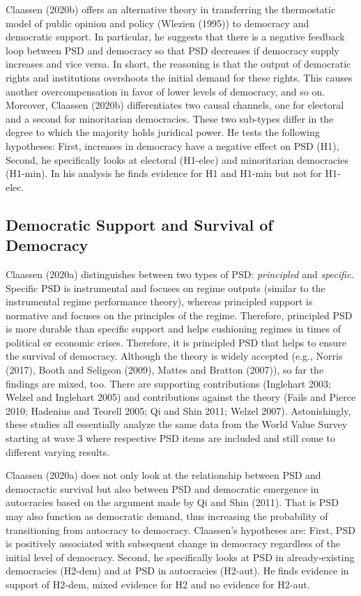 \documentclass[12pt,english,a4paper,oneside]{article}
\theoremstyle{definition}
\theoremstyle{definition}
\theoremstyle{definition}
\theoremstyle{definition}
\theoremstyle{remark}
\begin{document}
Claassen (2020b) offers an alternative theory in transferring the thermostatic model of public opinion and policy (Wlezien (1995)) to democracy and democratic support. In particular, he suggests that there is a negative feedback loop between PSD and democracy so that PSD decreases if democracy supply increases and vice versa. In short, the reasoning is that the output of democratic rights and institutions overshoots the initial demand for these rights. This causes another overcompensation in favor of lower levels of democracy, and so on. Moreover, Claassen (2020b) differentiates two causal channels, one for electoral and a second for minoritarian democracies. These two sub-types differ in the degree to which the majority holds juridical power. He tests the following hypotheses: First, increases in democracy have a negative effect on PSD (H1), Second, he specifically looks at electoral (H1-elec) and minoritarian democracies (H1-min). In his analysis he finds evidence for H1 and H1-min but not for H1-elec.

\hypertarget{democratic-support-and-survival-of-democracy}{%
\subsection{Democratic Support and Survival of Democracy}\label{democratic-support-and-survival-of-democracy}}

Claassen (2020a) distinguishes between two types of PSD: \emph{principled} and \emph{specific}. Specific PSD is instrumental and focuses on regime outputs (similar to the instrumental regime performance theory), whereas principled support is normative and focuses on the principles of the regime. Therefore, principled PSD is more durable than specific support and helps cushioning regimes in times of political or economic crises. Therefore, it is principled PSD that helps to ensure the survival of democracy. Although the theory is widely accepted (e.g., Norris (2017), Booth and Seligson (2009), Mattes and Bratton (2007)), so far the findings are mixed, too. There are supporting contributions (Inglehart 2003; Welzel and Inglehart 2005) and contributions against the theory (Fails and Pierce 2010; Hadenius and Teorell 2005; Qi and Shin 2011; Welzel 2007). Astonishingly, these studies all essentially analyze the same data from the World Value Survey starting at wave 3 where respective PSD items are included and still come to different varying results.

Claassen (2020a) does not only look at the relationship between PSD and democractic survival but also between PSD and democratic emergence in autocracies based on the argument made by Qi and Shin (2011). That is PSD may also function as democratic demand, thus increasing the probability of transitioning from autocracy to democracy. Claassen's hypotheses are: First, PSD is positively associated with subsequent change in democracy regardless of the initial level of democracy. Second, he specifically looks at PSD in already-existing democracies (H2-dem) and at PSD in autocracies (H2-aut). He finds evidence in support of H2-dem, mixed evidence for H2 and no evidence for H2-aut.
\end{document}
